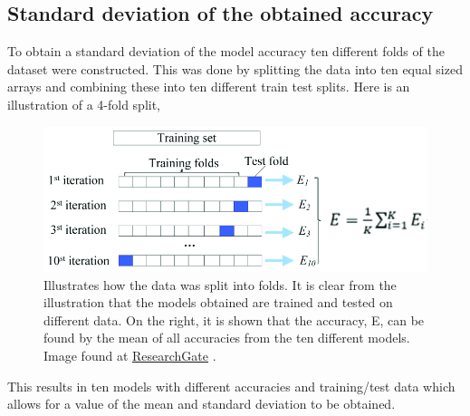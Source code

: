 \documentclass[11pt, fleqn, titlepage]{article}
\begin{document}
	\subsection{Standard deviation of the obtained accuracy} \label{standard_deviation}
	To obtain a standard deviation of the model accuracy ten different folds of the dataset were constructed. This was done by splitting the data into ten equal sized arrays and combining these into ten different train test splits. Here is an illustration of a 4-fold split, 
	
	\begin{figure}[H]
		\centering
		\includegraphics[width=0.8\linewidth]{imgs/kfolds2}
		\caption{Illustrates how the data was split into folds. It is clear from the illustration that the models obtained are trained and tested on different data. On the right, it is shown that the accuracy, E, can be found by the mean of all accuracies from the ten different models. Image found at \href{https://www.researchgate.net/figure/Diagram-of-k-fold-cross-validation-with-k-10-Image-from-Karl-Rosaen-Log_fig1_332370436}{ResearchGate} \cite{researchgate}. }
		\label{fig:kfolds}
	\end{figure}
	
	\noindent
	This results in ten models with different accuracies and training/test data which allows for a value of the mean and standard deviation to be obtained.
	
\end{document}
